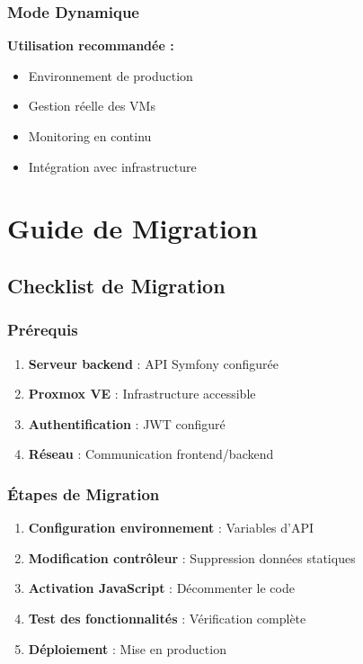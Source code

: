 \documentclass[12pt,a4paper]{report}
\begin{document}
\subsection{Mode Dynamique}

\textbf{Utilisation recommandée :}
\begin{itemize}
    \item Environnement de production
    \item Gestion réelle des VMs
    \item Monitoring en continu
    \item Intégration avec infrastructure
\end{itemize}

\chapter{Guide de Migration}

\section{Checklist de Migration}

\subsection{Prérequis}

\begin{enumerate}
    \item \textbf{Serveur backend} : API Symfony configurée
    \item \textbf{Proxmox VE} : Infrastructure accessible
    \item \textbf{Authentification} : JWT configuré
    \item \textbf{Réseau} : Communication frontend/backend
\end{enumerate}

\subsection{Étapes de Migration}

\begin{enumerate}
    \item \textbf{Configuration environnement} : Variables d'API
    \item \textbf{Modification contrôleur} : Suppression données statiques
    \item \textbf{Activation JavaScript} : Décommenter le code
    \item \textbf{Test des fonctionnalités} : Vérification complète
    \item \textbf{Déploiement} : Mise en production
\end{enumerate}
\end{document}
